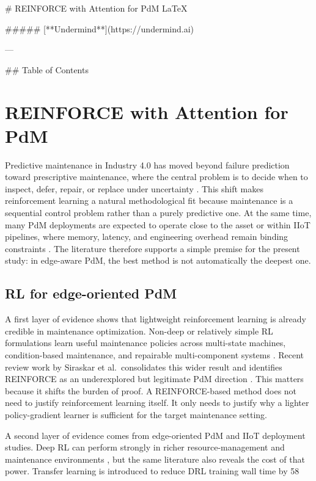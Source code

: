 # REINFORCE with Attention for PdM LaTeX

##### [**Undermind**](https://undermind.ai)

---


## Table of Contents


\section{\* REINFORCE with Attention for PdM} \label{sec:reinforce_attention_pdm}

Predictive maintenance in Industry 4.0 has moved beyond failure prediction toward prescriptive maintenance, where the central problem is to decide when to inspect, defer, repair, or replace under uncertainty \cite{Com20,Ans19,Sir23,Zha24b}. This shift makes reinforcement learning a natural methodological fit because maintenance is a sequential control problem rather than a purely predictive one. At the same time, many PdM deployments are expected to operate close to the asset or within IIoT pipelines, where memory, latency, and engineering overhead remain binding constraints \cite{Com20,Pan23,Njo24}. The literature therefore supports a simple premise for the present study: in edge-aware PdM, the best method is not automatically the deepest one.

\subsection{RL for edge-oriented PdM}

A first layer of evidence shows that lightweight reinforcement learning is already credible in maintenance optimization. Non-deep or relatively simple RL formulations learn useful maintenance policies across multi-state machines, condition-based maintenance, and repairable multi-component systems \cite{Wan14,Ads20,You20}. Recent review work by Siraskar et al. consolidates this wider result and identifies REINFORCE as an underexplored but legitimate PdM direction \cite{Sir23}. This matters because it shifts the burden of proof. A REINFORCE-based method does not need to justify reinforcement learning itself. It only needs to justify why a lighter policy-gradient learner is sufficient for the target maintenance setting.

A second layer of evidence comes from edge-oriented PdM and IIoT deployment studies. Deep RL can perform strongly in richer resource-management and maintenance environments \cite{Ong22,Ong22b}, but the same literature also reveals the cost of that power. Transfer learning is introduced to reduce DRL training wall time by 58%

